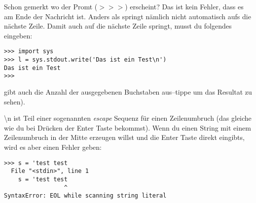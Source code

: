 Schon gemerkt wo der Promt ($>>>$) erscheint? Das ist kein Fehler, dass es am Ende der Nachricht ist. Anders als  springt nämlich  nicht automatisch aufs die nächste Zeile. Damit  auch auf die nächste Zeile springt, musst du folgendes eingeben:

\begin{Verbatim}[frame=single]
>>> import sys
>>> l = sys.stdout.write('Das ist ein Test\n')
Das ist ein Test
>>>
\end{Verbatim}

\noindent
 gibt auch die Anzahl der ausgegebenen Buchstaben aus--tippe  um das Resultat zu sehen).

\noindent
{\textbackslash}n ist Teil einer sogenannten \emph{escape} Sequenz für einen Zeilenumbruch (das gleiche wie du bei Drücken der Enter Taste bekommst). Wenn du einen String mit einem Zeilenumbruch in der Mitte erzeugen willst und die Enter Taste direkt eingibts, wird es aber einen Fehler geben: 

\begin{Verbatim}[frame=single]
>>> s = 'test test
  File "<stdin>", line 1
    s = 'test test
                 ^
SyntaxError: EOL while scanning string literal
\end{Verbatim}

